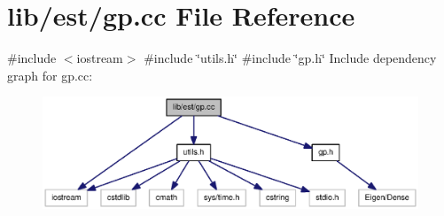 \section{lib/est/gp.cc \-File \-Reference}
\label{gp_8cc}
{\ttfamily \#include $<$iostream$>$}\*
{\ttfamily \#include \char`\"{}utils.\-h\char`\"{}}\*
{\ttfamily \#include \char`\"{}gp.\-h\char`\"{}}\*
\-Include dependency graph for gp.\-cc\-:
\nopagebreak
\begin{figure}[H]
\begin{center}
\leavevmode
\includegraphics[width=350pt]{gp_8cc__incl}
\end{center}
\end{figure}
